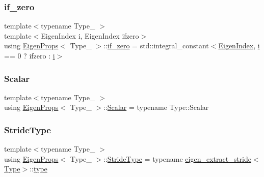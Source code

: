 \subsubsection{\texorpdfstring{if\_zero}{if\_zero}}
{\footnotesize\ttfamily template$<$typename Type\+\_\+ $>$ \\
template$<$Eigen\+Index i, Eigen\+Index ifzero$>$ \\
using \mbox{\hyperlink{struct_eigen_props}{Eigen\+Props}}$<$ Type\+\_\+ $>$\+::\mbox{\hyperlink{struct_eigen_props_aa728072a2702217ee987bf9ab3b9d07d}{if\+\_\+zero}} =  std\+::integral\+\_\+constant$<$\mbox{\hyperlink{eigen_8h_a4e595ab182718d84a409dd05e0829bdd}{Eigen\+Index}}, \mbox{\hyperlink{abstract_8h_a13235ab5ddf5c2ccd5ca35ab01d91328}{i}} == 0 ? ifzero \+: \mbox{\hyperlink{abstract_8h_a13235ab5ddf5c2ccd5ca35ab01d91328}{i}}$>$}

\mbox{\label{struct_eigen_props_ae36317e24288de2c7b47017ce58acc37}} 
\subsubsection{\texorpdfstring{Scalar}{Scalar}}
{\footnotesize\ttfamily template$<$typename Type\+\_\+ $>$ \\
using \mbox{\hyperlink{struct_eigen_props}{Eigen\+Props}}$<$ Type\+\_\+ $>$\+::\mbox{\hyperlink{struct_eigen_props_ae36317e24288de2c7b47017ce58acc37}{Scalar}} =  typename Type\+::\+Scalar}

\mbox{\label{struct_eigen_props_a21dcc2d713c484e7a84e679c793e8fea}} 
\subsubsection{\texorpdfstring{StrideType}{StrideType}}
{\footnotesize\ttfamily template$<$typename Type\+\_\+ $>$ \\
using \mbox{\hyperlink{struct_eigen_props}{Eigen\+Props}}$<$ Type\+\_\+ $>$\+::\mbox{\hyperlink{struct_eigen_props_a21dcc2d713c484e7a84e679c793e8fea}{Stride\+Type}} =  typename \mbox{\hyperlink{structeigen__extract__stride}{eigen\+\_\+extract\+\_\+stride}}$<$\mbox{\hyperlink{struct_eigen_props_ababed0b6298eeb5f4ded06da92c96cd7}{Type}}$>$\+::\mbox{\hyperlink{_s_d_l__opengl_8h_ad5ddf6fca7b585646515660e810e0188}{type}}}

